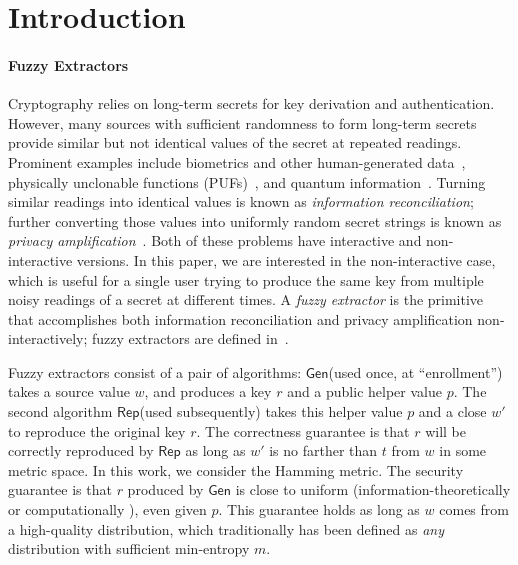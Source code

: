 \documentclass[11pt]{article}
\newcommand{\class}[1]{{\ensuremath{\mathsf{#1}}}}
\newcommand{\gen}{\ensuremath{\class{Gen}}\xspace}
\newcommand{\rep}{\ensuremath{\class{Rep}}\xspace}
\begin{document}
\section{Introduction}\label{sec:introduction}

\paragraph{Fuzzy Extractors}
Cryptography relies on long-term secrets for key derivation and authentication. However, many sources with sufficient randomness to form long-term secrets provide similar but not identical values of the secret at repeated readings. Prominent examples include biometrics and other human-generated data~\cite{daugman2004,zviran1993comparison,brostoff2000passfaces,ellison2000protecting,mayrhofer2009shake,monrose2002password},
physically unclonable functions (PUFs)~\cite{pappu2002physical,tuyls2006puf,gassend2002silicon,suh2007physical},
and quantum information~\cite{bennett1988privacy}. Turning similar readings into identical values is known as \emph{information reconciliation}; further converting those values into uniformly random secret strings is known as \emph{privacy amplification}~\cite{bennett1988privacy}.
Both of these problems have interactive and non-interactive versions.  In this paper, we are interested in the non-interactive case, which is useful for a single user trying to produce the same key from multiple noisy readings of a secret at different times.
 A \emph{fuzzy extractor} is the primitive that accomplishes both information reconciliation and privacy amplification non-interactively; fuzzy extractors are defined in~\cite{DBLP:journals/siamcomp/DodisORS08}.


Fuzzy extractors consist of a pair of algorithms: \gen (used once, at ``enrollment'') takes a source value $w$, and produces a key $r$ and a public helper value $p$.  The second algorithm \rep (used subsequently) takes this helper value $p$ and a close $w'$ to reproduce the original key $r$.
The correctness guarantee is that $r$ will be correctly reproduced by \rep as long as $w'$ is no farther than $t$ from $w$ in some metric space. In this work, we consider the Hamming metric.
 The security guarantee is that $r$ produced by \gen is close to uniform (information-theoretically \cite{DBLP:journals/siamcomp/DodisORS08} or computationally \cite{fuller2013computational}), even given $p$. This guarantee holds as long as $w$ comes from a high-quality distribution, which
traditionally has been defined as \emph{any} distribution with sufficient min-entropy $m$.
\end{document}
